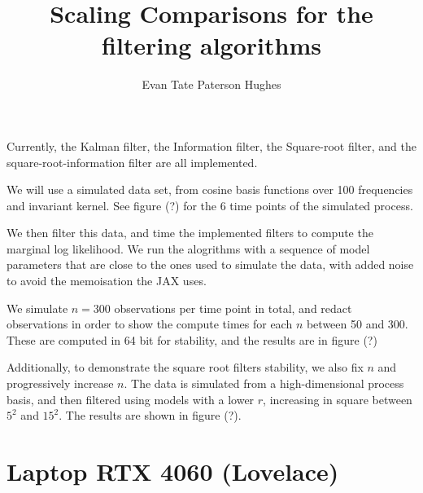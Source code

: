 \documentclass[
]{report}
\title{Scaling Comparisons for the filtering algorithms}
\author{Evan Tate Paterson Hughes}
\date{}
\renewcommand*\contentsname{Table of contents}
\newcommand\contentsname{Table of contents}
\begin{document}
\maketitle

\renewcommand*\contentsname{Table of contents}
{
\hypersetup{linkcolor=}
\setcounter{tocdepth}{2}
\tableofcontents
}

Currently, the Kalman filter, the Information filter, the Square-root
filter, and the square-root-information filter are all implemented.

We will use a simulated data set, from cosine basis functions over 100
frequencies and invariant kernel. See figure (?) for the 6 time points
of the simulated process.

We then filter this data, and time the implemented filters to compute
the marginal log likelihood. We run the alogrithms with a sequence of
model parameters that are close to the ones used to simulate the data,
with added noise to avoid the memoisation the JAX uses.

We simulate \(n=300\) observations per time point in total, and redact
observations in order to show the compute times for each \(n\) between
50 and 300. These are computed in 64 bit for stability, and the results
are in figure (?)

Additionally, to demonstrate the square root filters stability, we also
fix \(n\) and progressively increase \(n\). The data is simulated from a
high-dimensional process basis, and then filtered using models with a
lower \(r\), increasing in square between \(5^2\) and \(15^2\). The
results are shown in figure (?).

\chapter{Laptop RTX 4060 (Lovelace)}\label{laptop-rtx-4060-lovelace}
\end{document}
